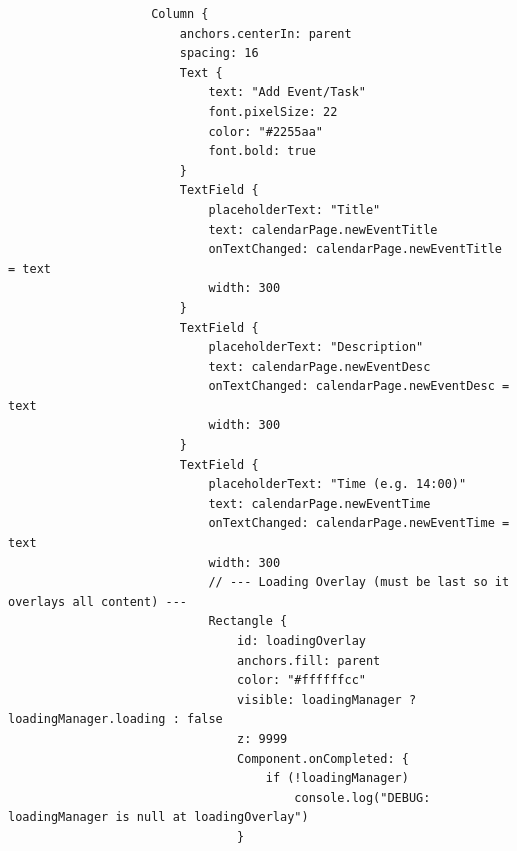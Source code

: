 \documentclass{report}
\begin{document}
\begin{lstlisting}
                    Column {
                        anchors.centerIn: parent
                        spacing: 16
                        Text {
                            text: "Add Event/Task"
                            font.pixelSize: 22
                            color: "#2255aa"
                            font.bold: true
                        }
                        TextField {
                            placeholderText: "Title"
                            text: calendarPage.newEventTitle
                            onTextChanged: calendarPage.newEventTitle = text
                            width: 300
                        }
                        TextField {
                            placeholderText: "Description"
                            text: calendarPage.newEventDesc
                            onTextChanged: calendarPage.newEventDesc = text
                            width: 300
                        }
                        TextField {
                            placeholderText: "Time (e.g. 14:00)"
                            text: calendarPage.newEventTime
                            onTextChanged: calendarPage.newEventTime = text
                            width: 300
                            // --- Loading Overlay (must be last so it overlays all content) ---
                            Rectangle {
                                id: loadingOverlay
                                anchors.fill: parent
                                color: "#ffffffcc"
                                visible: loadingManager ? loadingManager.loading : false
                                z: 9999
                                Component.onCompleted: {
                                    if (!loadingManager)
                                        console.log("DEBUG: loadingManager is null at loadingOverlay")
                                }
                        

\end{lstlisting}
\end{document}
